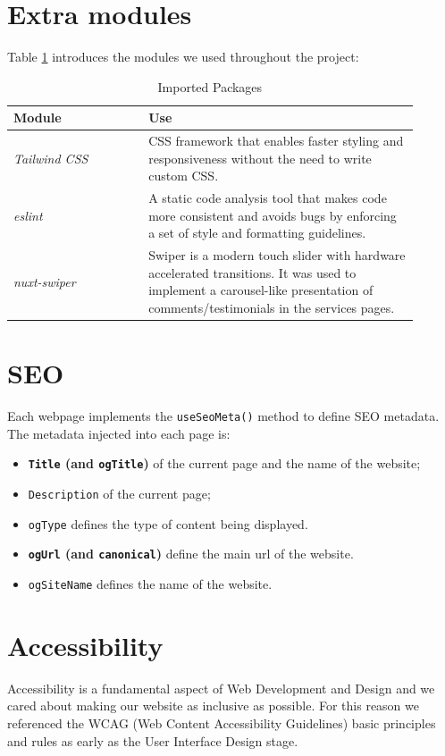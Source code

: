 \section{Extra modules}
Table \ref{table:modules} introduces the modules we used throughout the project:
\begin{table}[h!]
            \centering
            \begin{tabular}{|m{0.3\linewidth}|m{0.6\linewidth}|}
            \hline
            \textbf{Module} & \textbf{Use}\\
            \hline
                 \textit{Tailwind CSS} & CSS framework that enables faster styling and responsiveness without the need to write custom CSS.  \\
            \hline
                 \textit{eslint} & A static code analysis tool that makes code more consistent and avoids bugs by enforcing a set of style and formatting guidelines.  \\
            \hline
            \textit{nuxt-swiper} & Swiper is a modern touch slider with hardware accelerated transitions. It was used to implement a carousel-like presentation of comments/testimonials in the services pages.  \\
            \hline
            \end{tabular}
            \caption{Imported Packages}
            \label{table:modules}
\end{table}

\section{SEO}
Each webpage implements the \texttt{useSeoMeta()} method to define SEO metadata. The metadata injected into each page is:
\begin{itemize}
	\item \textbf{\texttt{Title} (and \texttt{ogTitle})} of the current page and the name of the website;
	\item \texttt{Description} of the current page;
	\item \texttt{ogType} defines the type of content being displayed.
	\item \textbf{\texttt{ogUrl} (and \texttt{canonical})} define the main url of the website.
	\item \texttt{ogSiteName} defines the name of the website.
\end{itemize}

\section{Accessibility}
Accessibility is a fundamental aspect of Web Development and Design and we cared about making our
website as inclusive as possible. For this reason we referenced the WCAG (Web Content Accessibility Guidelines) basic principles and rules
as early as the User Interface Design stage.

